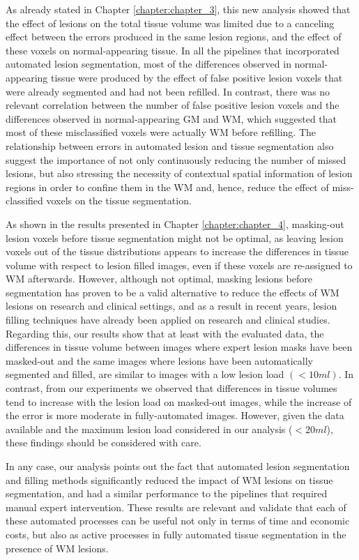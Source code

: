 As already stated in Chapter \ref{chapter:chapter_3}, this new analysis showed that the effect of lesions on the total tissue volume was limited due to a canceling effect between the errors produced in the same lesion regions, and the effect of these voxels on normal-appearing tissue. In all the pipelines that incorporated automated lesion segmentation, most of the differences observed in normal-appearing tissue were produced by the effect of false positive lesion voxels that were already segmented and had not been refilled. In contrast, there was no relevant correlation between the number of false positive lesion voxels and the differences observed in normal-appearing GM and WM, which suggested that most of these misclassified voxels were actually WM before refilling. The relationship between errors in automated lesion and tissue segmentation also suggest the importance of not only continuously reducing the number of missed lesions, but also stressing the necessity of contextual spatial information of lesion regions in order to confine them in the WM and, hence, reduce the effect of miss-classified voxels on the tissue segmentation.

As shown in the results presented in Chapter \ref{chapter:chapter_4}, masking-out lesion voxels before tissue segmentation might not be optimal, as leaving lesion voxels out of the tissue distributions appears to increase the differences in tissue volume with respect to lesion filled images, even if these voxels are re-assigned to WM afterwards. However, although not optimal, masking lesions before segmentation has proven to be a valid alternative to reduce the effects of WM lesions on research and clinical settings, and as a result in recent years, lesion filling techniques have already been applied on research and clinical studies. Regarding this, our results show that at least with the evaluated data, the differences in tissue volume between images where expert lesion masks have been masked-out and the same images where lesions have been automatically segmented and filled, are similar to images with a low lesion load $(<10ml)$. In contrast, from our experiments we observed that differences in tissue volumes tend to increase with the lesion load on masked-out images, while the increase of the error is more moderate in  fully-automated images. However, given the data available and the maximum lesion load considered in our analysis ($<20ml$), these findings should be considered with care. 

In any case, our analysis points out the fact that automated lesion segmentation and filling methods significantly reduced the impact of WM lesions on tissue segmentation, and had a similar performance to the pipelines that required manual expert intervention. These results are relevant and validate that each of these automated processes can be useful not only in terms of time and economic costs, but also as active processes in fully automated tissue segmentation in the presence of WM lesions.

